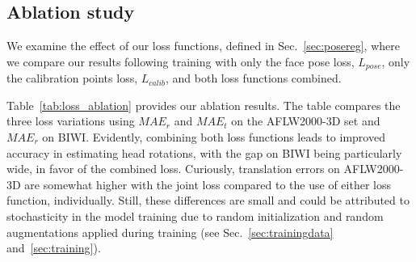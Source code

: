 \documentclass[final]{cvpr}
\begin{document}
\subsection{Ablation study}\label{sec:append:ablation}
We examine the effect of our loss functions, defined in Sec.~\ref{sec:posereg}, where we compare our results following training with only the face pose loss, $L_{pose}$, only the calibration points loss, $L_{calib}$, and both loss functions combined.

Table~\ref{tab:loss_ablation} provides our ablation results. The table compares the three loss variations using $MAE_r$ and $MAE_t$ on the AFLW2000-3D set and $MAE_r$ on BIWI. Evidently, combining both loss functions leads to improved accuracy in estimating head rotations, with the gap on BIWI being particularly wide, in favor of the combined loss. Curiously, translation errors on AFLW2000-3D are somewhat higher with the joint loss compared to the use of either loss function, individually. Still, these differences are small and could be attributed to stochasticity in the model training due to random initialization and random augmentations applied during training (see Sec.~\ref{sec:trainingdata} and~\ref{sec:training}).

\begin{table}[t]
    \centering
    \caption{Comparison of the effects of different loss functions on the pose estimation results obtained on the AFLW2000-3D and BIWI benchmarks. MAE$_r$ and MAE$_t$ are the rotational and translational MAE, respectively.}
    \label{tab:loss_ablation}\vspace{-5mm}
\end{table}
\end{document}
